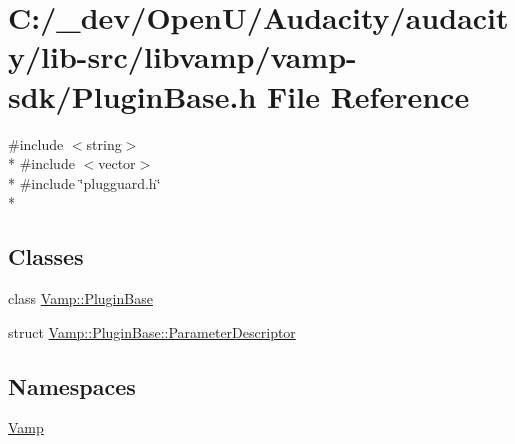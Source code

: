 \hypertarget{vamp-sdk_2_plugin_base_8h}{}\section{C\+:/\+\_\+dev/\+Open\+U/\+Audacity/audacity/lib-\/src/libvamp/vamp-\/sdk/\+Plugin\+Base.h File Reference}
\label{vamp-sdk_2_plugin_base_8h}
{\ttfamily \#include $<$string$>$}\\*
{\ttfamily \#include $<$vector$>$}\\*
{\ttfamily \#include \char`\"{}plugguard.\+h\char`\"{}}\\*
\subsection*{Classes}
\begin{DoxyCompactItemize}
\item 
class \hyperlink{class_vamp_1_1_plugin_base}{Vamp\+::\+Plugin\+Base}
\item 
struct \hyperlink{struct_vamp_1_1_plugin_base_1_1_parameter_descriptor}{Vamp\+::\+Plugin\+Base\+::\+Parameter\+Descriptor}
\end{DoxyCompactItemize}
\subsection*{Namespaces}
\begin{DoxyCompactItemize}
\item 
 \hyperlink{namespace_vamp}{Vamp}
\end{DoxyCompactItemize}
